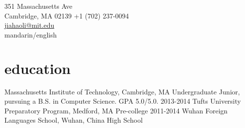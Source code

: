 \documentclass[__VERSION__]{friggeri-cv} %
\begin{document}
{351 Massachusetts Ave\\
Cambridge, MA 02139}
{+1 (702) 237-0094\\
\href{mailto:jiahaoli@mit.edu}{jiahaoli@mit.edu}\\
mandarin/english} %




\section{education}

\begin{entrylist}
  {Massachusetts Institute of Technology, Cambridge, MA}
  {Undergraduate}
  {Junior, pursuing a B.S. in Computer Science. GPA 5.0/5.0. }
  \sentry
  {2013-2014}
  {Tufts University Preparatory Program, Medford, MA}
  {Pre-college}
  \sentry
  {2011-2014}
  {Wuhan Foreign Languages School, Wuhan, China}
  {High School}
\end{entrylist}
\end{document}
